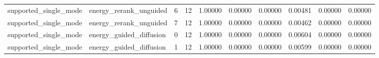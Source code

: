 \documentclass{article}
\begin{document}
\begin{table}[tbp]
{\begin{tabular}{llllllllll}
supported\_single\_mode & energy\_rerank\_unguided & 6 & 12 & 1.00000 & 0.00000 & 0.00000 & 0.00481 & 0.00000 & 0.00000 \\
supported\_single\_mode & energy\_rerank\_unguided & 7 & 12 & 1.00000 & 0.00000 & 0.00000 & 0.00462 & 0.00000 & 0.00000 \\
supported\_single\_mode & energy\_guided\_diffusion & 0 & 12 & 1.00000 & 0.00000 & 0.00000 & 0.00604 & 0.00000 & 0.00000 \\
supported\_single\_mode & energy\_guided\_diffusion & 1 & 12 & 1.00000 & 0.00000 & 0.00000 & 0.00599 & 0.00000 & 0.00000 \\
\bottomrule
\end{tabular}
}
\end{table}

\clearpage
\end{document}
